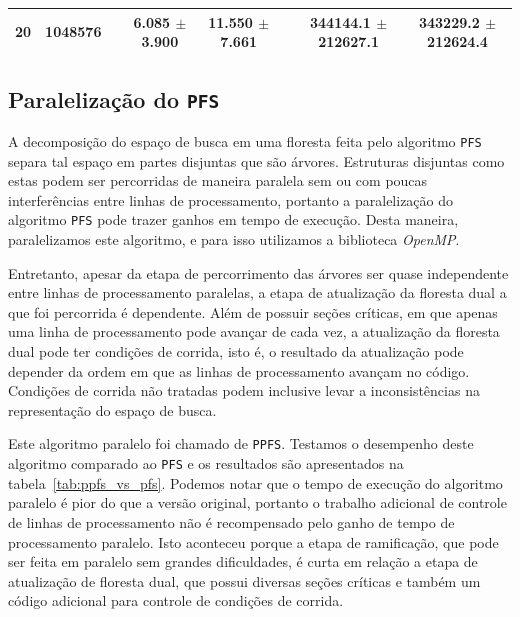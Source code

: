 \documentclass[12pt]{article}
\newcommand{\toolname}[1]{\textit{#1}}
\newcommand{\algname}[1]{\texttt{#1}}
\begin{document}
\begin{table}
\begin{tabular}{cc c cc c cc}
20 & 1048576 &&  6.085 $\pm$ 3.900 & 11.550 $\pm$ 7.661 &&  344144.1 $\pm$ 212627.1 & 343229.2 $\pm$ 212624.4 \\
\bottomrule 
\end{tabular}%
\end{table}


\subsection{Paralelização do \algname{PFS}}
\label{sec:ppfs}
A decomposição do espaço de busca em uma floresta feita pelo algoritmo
\algname{PFS} separa tal espaço em partes disjuntas que são árvores.
Estruturas disjuntas como estas podem ser percorridas de maneira 
paralela sem ou com poucas interferências entre linhas de processamento,
portanto a paralelização do algoritmo \algname{PFS} pode trazer ganhos 
em tempo de execução. Desta maneira, paralelizamos este algoritmo, e 
para isso utilizamos a biblioteca \toolname{OpenMP}.

Entretanto, apesar da etapa de percorrimento das árvores ser quase 
independente entre linhas de processamento paralelas, a etapa de 
atualização da floresta dual a que foi percorrida é dependente. Além
de possuir seções críticas, em que apenas uma linha de processamento 
pode avançar de cada vez, a atualização da floresta dual pode ter
condições de corrida, isto é, o resultado da atualização pode depender
da ordem em que as linhas de processamento avançam no código. Condições
de corrida não tratadas podem inclusive levar a inconsistências na
representação do espaço de busca.

Este algoritmo paralelo foi chamado de \algname{PPFS}. Testamos o 
desempenho deste algoritmo comparado ao \algname{PFS} e os resultados
são apresentados na tabela~\ref{tab:ppfs_vs_pfs}. Podemos notar que o
tempo de execução do algoritmo paralelo é pior do que a versão original,
portanto o trabalho adicional de controle de linhas de processamento
não é recompensado pelo ganho de tempo de processamento paralelo. Isto
aconteceu porque a etapa de ramificação, que pode ser feita em paralelo
sem grandes dificuldades, é curta em relação a etapa de atualização de
floresta dual, que possui diversas seções críticas e também um código
adicional para controle de condições de corrida.
\end{document}
